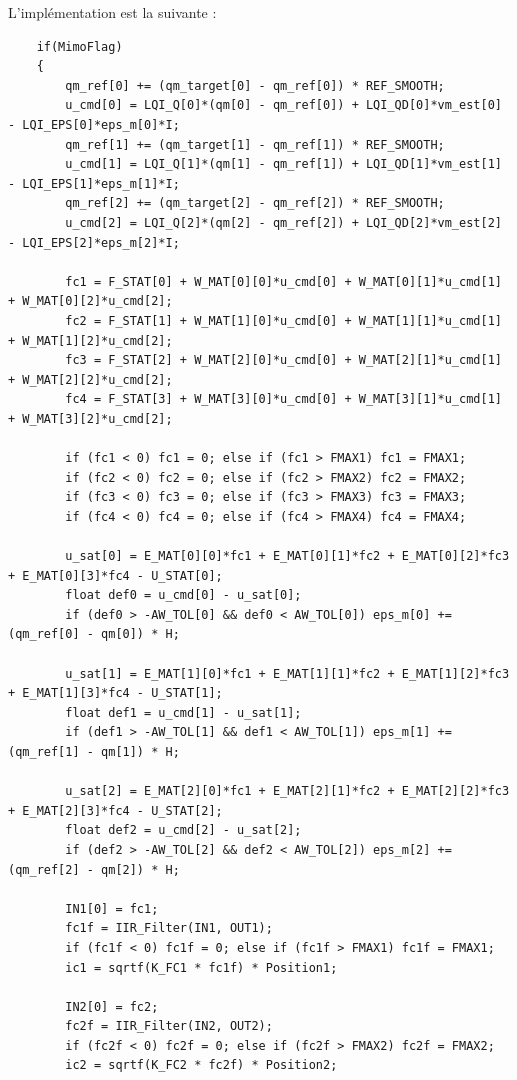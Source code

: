 L'implémentation est la suivante :

\begin{verbatim}
    if(MimoFlag)
    {
        qm_ref[0] += (qm_target[0] - qm_ref[0]) * REF_SMOOTH;
        u_cmd[0] = LQI_Q[0]*(qm[0] - qm_ref[0]) + LQI_QD[0]*vm_est[0] - LQI_EPS[0]*eps_m[0]*I;
        qm_ref[1] += (qm_target[1] - qm_ref[1]) * REF_SMOOTH;
        u_cmd[1] = LQI_Q[1]*(qm[1] - qm_ref[1]) + LQI_QD[1]*vm_est[1] - LQI_EPS[1]*eps_m[1]*I;
        qm_ref[2] += (qm_target[2] - qm_ref[2]) * REF_SMOOTH;
        u_cmd[2] = LQI_Q[2]*(qm[2] - qm_ref[2]) + LQI_QD[2]*vm_est[2] - LQI_EPS[2]*eps_m[2]*I;

        fc1 = F_STAT[0] + W_MAT[0][0]*u_cmd[0] + W_MAT[0][1]*u_cmd[1] + W_MAT[0][2]*u_cmd[2];
        fc2 = F_STAT[1] + W_MAT[1][0]*u_cmd[0] + W_MAT[1][1]*u_cmd[1] + W_MAT[1][2]*u_cmd[2];
        fc3 = F_STAT[2] + W_MAT[2][0]*u_cmd[0] + W_MAT[2][1]*u_cmd[1] + W_MAT[2][2]*u_cmd[2];
        fc4 = F_STAT[3] + W_MAT[3][0]*u_cmd[0] + W_MAT[3][1]*u_cmd[1] + W_MAT[3][2]*u_cmd[2];

        if (fc1 < 0) fc1 = 0; else if (fc1 > FMAX1) fc1 = FMAX1;
        if (fc2 < 0) fc2 = 0; else if (fc2 > FMAX2) fc2 = FMAX2;
        if (fc3 < 0) fc3 = 0; else if (fc3 > FMAX3) fc3 = FMAX3;
        if (fc4 < 0) fc4 = 0; else if (fc4 > FMAX4) fc4 = FMAX4;

        u_sat[0] = E_MAT[0][0]*fc1 + E_MAT[0][1]*fc2 + E_MAT[0][2]*fc3 + E_MAT[0][3]*fc4 - U_STAT[0];
        float def0 = u_cmd[0] - u_sat[0];
        if (def0 > -AW_TOL[0] && def0 < AW_TOL[0]) eps_m[0] += (qm_ref[0] - qm[0]) * H;

        u_sat[1] = E_MAT[1][0]*fc1 + E_MAT[1][1]*fc2 + E_MAT[1][2]*fc3 + E_MAT[1][3]*fc4 - U_STAT[1];
        float def1 = u_cmd[1] - u_sat[1];
        if (def1 > -AW_TOL[1] && def1 < AW_TOL[1]) eps_m[1] += (qm_ref[1] - qm[1]) * H;

        u_sat[2] = E_MAT[2][0]*fc1 + E_MAT[2][1]*fc2 + E_MAT[2][2]*fc3 + E_MAT[2][3]*fc4 - U_STAT[2];
        float def2 = u_cmd[2] - u_sat[2];
        if (def2 > -AW_TOL[2] && def2 < AW_TOL[2]) eps_m[2] += (qm_ref[2] - qm[2]) * H;

        IN1[0] = fc1;
        fc1f = IIR_Filter(IN1, OUT1);
        if (fc1f < 0) fc1f = 0; else if (fc1f > FMAX1) fc1f = FMAX1;
        ic1 = sqrtf(K_FC1 * fc1f) * Position1;

        IN2[0] = fc2;
        fc2f = IIR_Filter(IN2, OUT2);
        if (fc2f < 0) fc2f = 0; else if (fc2f > FMAX2) fc2f = FMAX2;
        ic2 = sqrtf(K_FC2 * fc2f) * Position2;


\end{verbatim}
